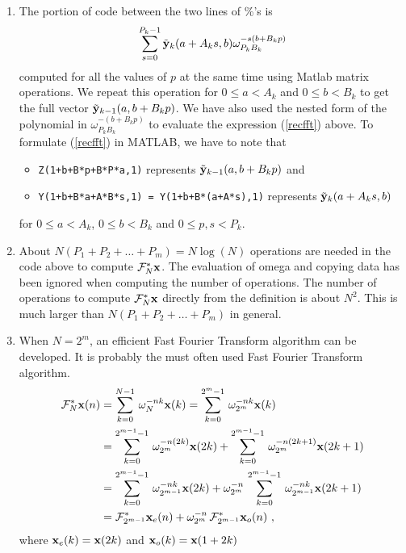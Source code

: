 \begin{rmkList}
\begin{enumerate}
\item The portion of code between the two lines of \%'s is 
\begin{equation}\label{recfft}
\sum_{s=0}^{P_k-1} \tilde{\mathbf{y}}_k(a+A_k s, b) \omega_{P_k B_k}^{-s(b+B_k p)}
\end{equation}
computed for all the values of $p$ at the same time using Matlab
matrix operations.  We repeat this operation for $0\leq a < A_k$ and
$0\leq b < B_k$ to get the full vector $\tilde{\mathbf{y}}_{k-1}(a, b+B_k p)$.
We have also used the nested form of the polynomial in
$\omega_{P_k B_k}^{-(b+B_k p)}$ to evaluate the expression
(\ref{recfft}) above.  To formulate (\ref{recfft}) in MATLAB, we have to
note that
\begin{itemize}
\item \verb!Z(1+b+B*p+B*P*a,1)! represents
$\tilde{\mathbf{y}}_{k-1}(a, b+B_k p)$ and
\item \verb!Y(1+b+B*a+A*B*s,1) = Y(1+b+B*(a+A*s),1)! represents
$\tilde{\mathbf{y}}_k(a+A_k s, b)$
\end{itemize}
for $0\leq a < A_k$, $0\leq b<B_k$ and $0\leq p,s < P_k$.
\item About $N(P_1+P_2+\ldots+P_m) = N \log(N)$ operations are needed
in the code above to compute $\mathcal{F}^\ast_N \mathbf{x}$.  The evaluation
of omega and copying data has been ignored when computing the number
of operations.  The number of operations to compute
$\mathcal{F}^\ast_N\mathbf{x}$ directly from the definition is about $N^2$.
This is much larger than $N(P_1+P_2+\ldots+P_m)$ in general.
\item When $N=2^m$, an efficient Fast Fourier Transform algorithm can
be developed.  It is probably the must often used Fast Fourier
Transform algorithm.
\begin{align*}
\mathcal{F}^\ast_N \mathbf{x}(n)
&= \sum_{k=0}^{N-1} \, \omega_N^{-nk} \mathbf{x}(k)
= \sum_{k=0}^{2^m-1} \, \omega_{2^m}^{-nk} \mathbf{x}(k) \\
&= \sum_{k=0}^{2^{m-1}-1} \, \omega_{2^m}^{-n(2k)} \mathbf{x}(2k) +
\sum_{k=0}^{2^{m-1}-1} \, \omega_{2^m}^{-n(2k+1)} \mathbf{x}(2k+1) \\
&= \sum_{k=0}^{2^{m-1}-1} \, \omega_{2^{m-1}}^{-nk} \mathbf{x}(2k) +
\omega_{2^m}^{-n} \,
\sum_{k=0}^{2^{m-1}-1} \, \omega_{2^{m-1}}^{-nk} \mathbf{x}(2k+1) \\
&= \mathcal{F}^\ast_{2^{m-1}} \mathbf{x}_{e}(n) +
\omega_{2^m}^{-n} \, \mathcal{F}^\ast_{2^{m-1}} \mathbf{x}_{o}(n) \ ,
\end{align*}
where $\mathbf{x}_{e}(k) = \mathbf{x}(2k)$ and $\mathbf{x}_{o}(k) = \mathbf{x}(1+2k)$

\end{enumerate}
\end{rmkList}
